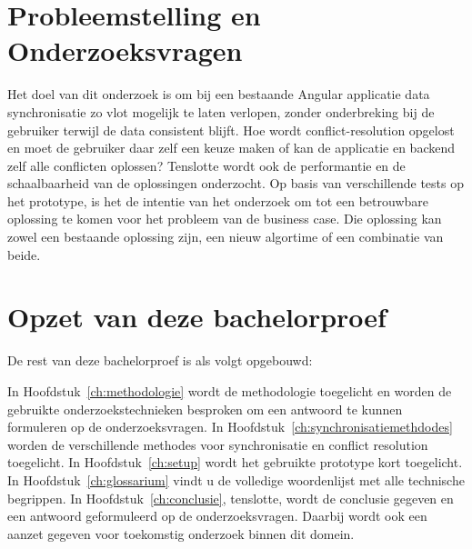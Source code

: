 \section{Probleemstelling en Onderzoeksvragen}
\label{sec:onderzoeksvragen}
Het doel van dit onderzoek is om bij een bestaande Angular applicatie data synchronisatie zo vlot mogelijk te laten verlopen, zonder onderbreking bij de gebruiker terwijl de data consistent blijft. Hoe wordt conflict-resolution opgelost en moet de gebruiker daar zelf een keuze maken of kan de applicatie en backend zelf alle conflicten oplossen? Tenslotte wordt ook de performantie en de schaalbaarheid van de oplossingen onderzocht. Op basis van verschillende tests op het prototype, is het de intentie van het onderzoek om tot een betrouwbare oplossing te komen voor het probleem van de business case. Die oplossing kan zowel een bestaande oplossing zijn, een nieuw algortime of een combinatie van beide.

\section{Opzet van deze bachelorproef}
\label{sec:opzet-bachelorproef}


De rest van deze bachelorproef is als volgt opgebouwd:

In Hoofdstuk~\ref{ch:methodologie} wordt de methodologie toegelicht en worden de gebruikte onderzoekstechnieken besproken om een antwoord te kunnen formuleren op de onderzoeksvragen.
In Hoofdstuk~\ref{ch:synchronisatiemethdodes} worden de verschillende methodes voor synchronisatie en conflict resolution toegelicht.
In Hoofdstuk~\ref{ch:setup} wordt het gebruikte prototype kort toegelicht.
In Hoofdstuk~\ref{ch:glossarium} vindt u de volledige woordenlijst met alle technische begrippen.
In Hoofdstuk~\ref{ch:conclusie}, tenslotte, wordt de conclusie gegeven en een antwoord geformuleerd op de onderzoeksvragen. Daarbij wordt ook een aanzet gegeven voor toekomstig onderzoek binnen dit domein.

